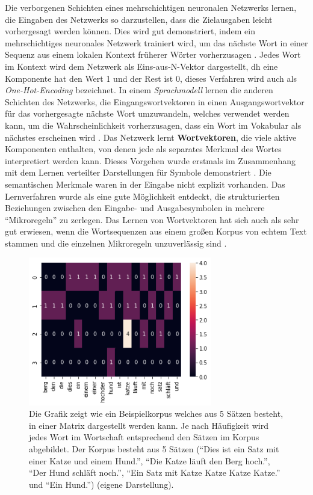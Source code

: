 Die verborgenen Schichten eines mehrschichtigen neuronalen Netzwerks lernen, die Eingaben des Netzwerks so darzustellen, dass die Zielausgaben leicht vorhergesagt werden können. Dies wird gut demonstriert, indem ein mehrschichtiges neuronales Netzwerk trainiert wird, um das nächste Wort in einer Sequenz aus einem lokalen Kontext früherer Wörter vorherzusagen \cite*{Bengio2003}. Jedes Wort im Kontext wird dem Netzwerk als Eins-aus-N-Vektor dargestellt, dh eine Komponente hat den Wert 1 und der Rest ist 0, dieses Verfahren wird auch als \textit{One-Hot-Encoding} bezeichnet. In einem \textit{Sprachmodell} lernen die anderen Schichten des Netzwerks, die Eingangswortvektoren in einen Ausgangswortvektor für das vorhergesagte nächste Wort umzuwandeln, welches verwendet werden kann, um die Wahrscheinlichkeit vorherzusagen, dass ein Wort im Vokabular als nächstes erscheinen wird \cite*{Lecun2015}. Das Netzwerk lernt \textbf{Wortvektoren}, die viele aktive Komponenten enthalten, von denen jede als separates Merkmal des Wortes interpretiert werden kann. Dieses Vorgehen wurde erstmals im Zusammenhang mit dem Lernen verteilter Darstellungen für Symbole demonstriert \cite*{Rumelhart1986}. Die semantischen Merkmale waren in der Eingabe nicht explizit vorhanden. Das Lernverfahren wurde als eine gute Möglichkeit entdeckt, die strukturierten Beziehungen zwischen den Eingabe- und Ausgabesymbolen in mehrere \enquote{Mikroregeln} zu zerlegen. Das Lernen von Wortvektoren hat sich auch als sehr gut erwiesen, wenn die Wortsequenzen aus einem großen Korpus von echtem Text stammen und die einzelnen Mikroregeln unzuverlässig sind \cite*{Bengio2003}.


\begin{figure}[H]
    \centering
    \includegraphics[width=8cm]{kapitel3/onhot.png}
    \caption[One-Hot-Codierung als Eingabematrix]{Die Grafik zeigt wie ein Beispielkorpus welches aus 5 Sätzen besteht, in einer Matrix dargestellt werden kann. Je nach Häufigkeit wird jedes Wort im Wortschaft entsprechend den Sätzen im Korpus abgebildet. Der Korpus besteht aus 5 Sätzen (\enquote{Dies ist ein Satz mit einer Katze und einem Hund.}, \enquote{Die Katze läuft den Berg hoch.}, \enquote{Der Hund schläft noch.}, \enquote{Ein Satz mit Katze Katze Katze Katze.} und \enquote{Ein Hund.}) (eigene Darstellung).}
    \label{OneHotGrafik}
\end{figure}

